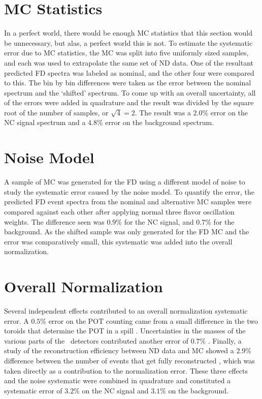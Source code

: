 \section{MC Statistics}

In a perfect world, there would be enough MC statistics that this section would be unnecessary, but alas, a perfect world this is not. To estimate the systematic error due to MC statistics, the MC was split into five uniformly sized samples, and each was used to extrapolate the same set of ND data. One of the resultant predicted FD spectra was labeled as nominal, and the other four were compared to this. The bin by bin differences were taken as the error between the nominal spectrum and the `shifted' spectrum. To come up with an overall uncertainty, all of the errors were added in quadrature and the result was divided by the square root of the number of samples, or $\sqrt{4} = 2$. The result was a $2.0\%$ error on the NC signal spectrum and a $4.8\%$ error on the background spectrum.

\section{Noise Model}

A sample of MC was generated for the FD using a different model of noise to study the systematic error caused by the noise model. To quantify the error, the predicted FD event spectra from the nominal and alternative MC samples were compared against each other after applying normal three flavor oscillation weights. The difference seen was $0.9\%$ for the NC signal, and $0.7\%$ for the background. As the shifted sample was only generated for the FD MC and the error was comparatively small, this systematic was added into the overall normalization.

\section{Overall Normalization}

Several independent effects contributed to an overall normalization systematic error. A $0.5\%$ error on the POT counting came from a small difference in the two toroids that determine the POT in a spill \cite{ref:TNBeam}. Uncertainties in the masses of the various parts of the \nova~detectors contributed another error of $0.7\%$ \cite{ref:MassError}. Finally, a study of the reconstruction efficiency between ND data and MC showed a $2.9\%$ difference between the number of events that get fully reconstructed \cite{ref:NDDataMCRecoEff}, which was taken directly as a contribution to the normalization error. These three effects and the noise systematic were combined in quadrature and constituted a systematic error of $3.2\%$ on the NC signal and $3.1\%$ on the background.

